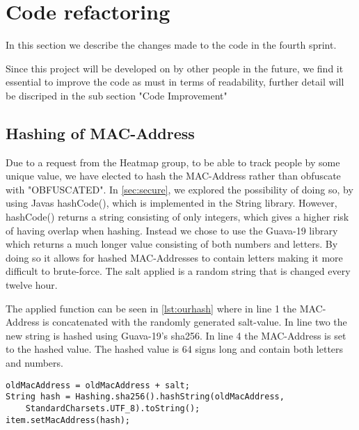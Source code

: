 \section{Code refactoring}
In this section we describe the changes made to the code in the fourth sprint.

Since this project will be developed on by other people in the future, we find it essential to improve the code as must in terms of readability, further detail will be discriped in the sub section "Code Improvement"

\subsection*{Hashing of MAC-Address}
Due to a request from the Heatmap group, to be able to track people by some unique value, we have elected to hash the MAC-Address rather than obfuscate with "OBFUSCATED". In \cref{sec:secure}, we explored the possibility of doing so, by using Javas hashCode(), which is implemented in the String library. However, hashCode() returns a string consisting of only integers, which gives a higher risk of having overlap when hashing. Instead we chose to use the Guava-19 library which returns a much longer value consisting of both numbers and letters. By doing so it allows for hashed MAC-Addresses to contain letters making it more difficult to brute-force. The salt applied is a random string that is changed every twelve hour. 

The applied function can be seen in \cref{lst:ourhash} where in line 1 the MAC-Address is concatenated with the randomly generated salt-value. In line two the new string is hashed using Guava-19's sha256. In line 4 the MAC-Address is set to the hashed value. The hashed value is 64 signs long and contain both letters and numbers.

\begin{lstlisting}[caption={Hashing a MAC-Address},label={lst:ourhash},language=inc_Java]
oldMacAddress = oldMacAddress + salt;
String hash = Hashing.sha256().hashString(oldMacAddress, 
	StandardCharsets.UTF_8).toString();
item.setMacAddress(hash);
\end{lstlisting}

